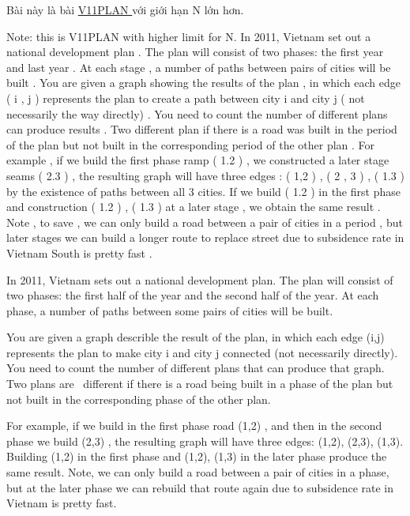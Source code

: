Bài này là bài    \href{http://vn.spoj.com/problems/V11PLAN/}{     V11PLAN    }    với giới hạn N lớn hơn.   

Note: this is V11PLAN with higher limit for N.     In 2011, Vietnam set out a national development plan . The plan will consist of two phases: the first year and last year . At each stage , a number of paths between pairs of cities will be built .       You are given a graph showing the results of the plan , in which each edge ( i , j ) represents the plan to create a path between city i and city j ( not necessarily the way directly) . You need to count the number of different plans can produce results . Two different plan if there is a road was built in the period of the plan but not built in the corresponding period of the other plan .       For example , if we build the first phase ramp ( 1.2 ) , we constructed a later stage seams ( 2.3 ) , the resulting graph will have three edges : ( 1,2 ) , ( 2 , 3 ) , ( 1.3 ) by the existence of paths between all 3 cities. If we build ( 1.2 ) in the first phase and construction ( 1.2 ) , ( 1.3 ) at a later stage , we obtain the same result . Note , to save , we can only build a road between a pair of cities in a period , but later stages we can build a longer route to replace street due to subsidence rate in Vietnam South is pretty fast .    

   In 2011, Vietnam sets out a national development plan. The plan will consist of two phases: the first half of the year and the second half of the year. At each phase, a number of paths between some pairs of cities will be built.  

   You are given a graph describle the result of the plan, in which each edge (i,j) represents the plan to make city i and city j connected (not necessarily directly). You need to count the number of different plans that can produce that graph. Two plans are  different if there is a road being built in a phase of the plan but not built in the corresponding phase of the other plan.  

   For example, if we build in the first phase road (1,2) , and then in the second phase we build (2,3) , the resulting graph will have three edges: (1,2), (2,3), (1,3). Building (1,2) in the first phase and (1,2), (1,3) in the later phase produce the same result. Note, we can only build a road between a pair of cities in a phase, but at the later phase we can rebuild that route again due to subsidence rate in Vietnam is pretty fast.